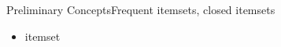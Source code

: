 \documentclass[14pt]{beamer}
\begin{document}
\begin{frame}{Preliminary Concepts}{Frequent itemsets, closed itemsets}
\begin{itemize}
\item itemset 
\end{itemize}
\end{frame}


\end{document}
